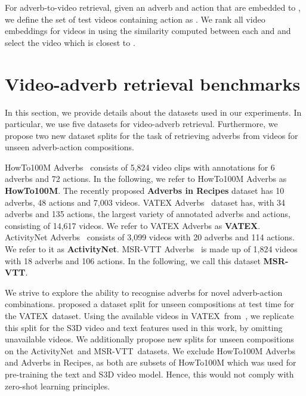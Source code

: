 \documentclass[table]{bmvc2k}
\newcommand{\vatex}{VATEX}
\newcommand{\msrvtt}{MSR-VTT}
\newcommand{\anet}{ActivityNet}
\newcommand{\air}{Adverbs in Recipes}
\begin{document}
For adverb-to-video retrieval, given an adverb  and action  that are embedded to , we define the set of test videos containing action  as . We rank all video embeddings  for videos in  using the similarity computed between each  and  and select the video which is closest to . 

\section{Video-adverb retrieval benchmarks}
In this section, we provide details about the datasets used in our experiments. In particular, we use five datasets for video-adverb retrieval. Furthermore, we propose two new dataset splits for the task of retrieving adverbs from videos for unseen adverb-action compositions. 

\label{dataset_section}
HowTo100M Adverbs~\cite{doughty_action_2020} consists of 5,824 video clips with annotations for 6 adverbs and 72 actions. In the following, we refer to HowTo100M Adverbs as \textbf{HowTo100M}.
The recently proposed \textbf{\air} dataset has 10 adverbs, 48 actions and 7,003 videos. 
VATEX Adverbs~\cite{doughty_how_2022} dataset has, with 34 adverbs and 135 actions, the largest variety of annotated adverbs and actions, consisting of 14,617 videos. We refer to VATEX Adverbs as \textbf{VATEX}. ActivityNet Adverbs~\cite{doughty_how_2022} consists of 3,099 videos with 20 adverbs and 114 actions. We refer to it as \textbf{\anet}. MSR-VTT Adverbs~\cite{doughty_how_2022} is made up of 1,824 videos with 18 adverbs and 106 actions. In the following, we call this dataset \textbf{\msrvtt}.


We strive to explore the ability to recognise adverbs for novel adverb-action combinations.
\cite{doughty_how_2022} proposed a dataset split for unseen compositions at test time for the \vatex\ dataset. 
Using the available videos in \vatex\ from~\cite{moltisanti2023learning}, we replicate this split for the S3D video and text features used in this work, by omitting unavailable videos.
We additionally propose new splits for unseen compositions on the \anet\ and \msrvtt\ datasets. We exclude HowTo100M Adverbs and \air, as both are subsets of HowTo100M which was used for pre-training the text and S3D video model. Hence, this would not comply with zero-shot learning principles. 
\end{document}
